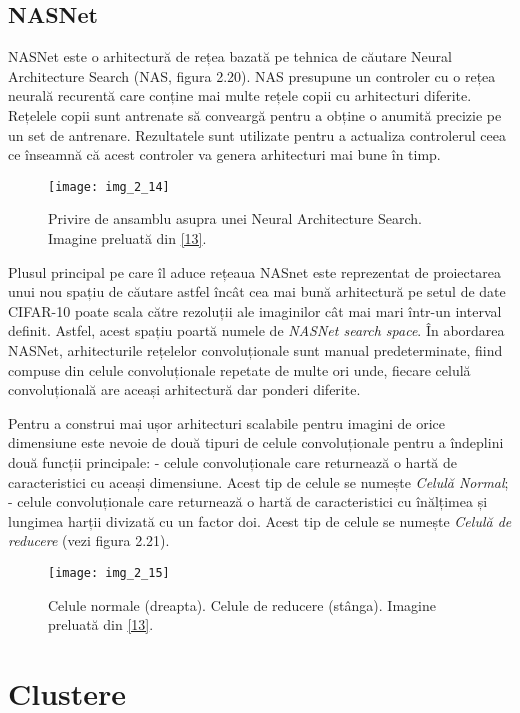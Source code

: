 \subsection{NASNet}
NASNet este o arhitectură de rețea bazată pe tehnica de căutare Neural Architecture Search (NAS, figura 2.20). NAS presupune un controler cu o rețea neurală recurentă care conține mai multe rețele copii cu arhitecturi diferite. Rețelele copii sunt antrenate să conveargă pentru a obține o anumită precizie pe un set de antrenare. Rezultatele sunt utilizate pentru a actualiza controlerul ceea ce înseamnă că acest controler va genera arhitecturi mai bune în timp.
\begin{figure}[!h]
	\centering
	\texttt{[image: img\_2\_14]}
	\caption[NAS]{Privire de ansamblu asupra unei Neural Architecture Search. Imagine preluată din \hyperlink{Zoph2018LearningTA}{[13]}.}
\end{figure}  

Plusul principal pe care îl aduce rețeaua NASnet este reprezentat de proiectarea unui nou spațiu de căutare astfel încât cea mai bună arhitectură pe setul de date CIFAR-10 poate scala către rezoluții ale imaginilor cât mai mari într-un interval definit. Astfel, acest spațiu poartă numele de \textit{NASNet search space}. În abordarea NASNet, arhitecturile rețelelor convoluționale sunt manual predeterminate, fiind compuse din celule convoluționale repetate de multe ori unde, fiecare celulă convoluțională are aceași arhitectură dar ponderi diferite.

Pentru a construi mai ușor arhitecturi scalabile pentru imagini de orice dimensiune este nevoie de două tipuri de celule convoluționale pentru a îndeplini două funcții principale: - celule convoluționale care returnează o hartă de caracteristici cu aceași dimensiune. Acest tip de celule se numește \textit{Celulă Normal}; - celule convoluționale care returnează o hartă de caracteristici cu înălțimea și lungimea harții divizată cu un factor doi. Acest tip de celule se numește \textit{Celulă de reducere} (vezi figura 2.21).
\begin{figure}[!h]
	\centering
	\texttt{[image: img\_2\_15]}
	\caption[Celule normale și de reducere]{Celule normale (dreapta). Celule de reducere (stânga). Imagine preluată din \hyperlink{Zoph2018LearningTA}{[13]}.}
\end{figure}  

\section{Clustere}

